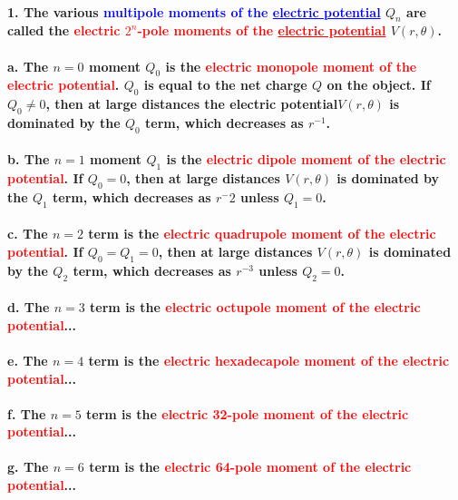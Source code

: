\documentclass{article}
\begin{document}
\paragraph{1. The various \textcolor{blue}{multipole moments of the \underline{electric potential}} $Q_n$ are called the \textcolor{red}{electric $2^n$-pole moments of the \underline{electric potential} } $V(r,\theta)$.}
\paragraph{\indent a. The $n=0$ moment $Q_0$ is the \textcolor{red}{electric monopole moment of the electric potential}. $Q_0$ is equal to the net charge $Q$ on the object. If $Q_0\neq0$, then at large distances the electric potential$V(r,\theta)$ is dominated by the $Q_0$ term, which decreases as $r^{-1}$.}
\paragraph{\indent b. The $n=1$ moment $Q_1$ is the \textcolor{red}{electric dipole moment of the electric potential}. If $Q_0=0$, then at large distances $V(r,\theta)$ is dominated by the $Q_1$ term, which decreases as $r^-2$ unless $Q_1=0$.}
\paragraph{\indent c. The $n=2$ term is the \textcolor{red}{electric quadrupole moment of the electric potential}. If $Q_0=Q_1=0$, then at large distances $V(r,\theta)$ is dominated by the $Q_2$ term, which decreases as $r^{-3}$ unless $Q_2=0$.}
\paragraph{\indent d. The $n=3$ term is the \textcolor{red}{electric octupole moment of the electric potential}...}
\paragraph{\indent e. The $n=4$ term is the \textcolor{red}{electric hexadecapole moment of the electric potential}...}
\paragraph{\indent f. The $n=5$ term is the \textcolor{red}{electric 32-pole moment of the electric potential}...}
\paragraph{\indent g. The $n=6$ term is the \textcolor{red}{electric 64-pole moment of the electric potential}...}
\end{document}
